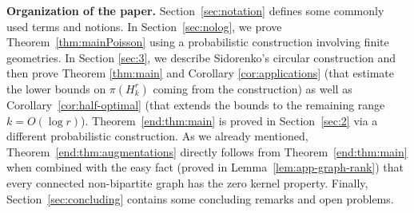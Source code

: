 \documentclass[10pt,a4paper]{article}
\numberwithin{equation}{section}
\theoremstyle{definition}
\theoremstyle{remark}
\newcommand{\hide}[1]{{\color{DarkGreen}#1}}
\renewcommand{\hide}[1]{}
\begin{document}
\medskip\noindent\textbf{Organization of the paper.} Section~\ref{sec:notation} defines some commonly used terms and notions. 
In Section~\ref{sec:nolog},  we prove Theorem~\ref{thm:mainPoisson} using a probabilistic construction involving finite geometries.
In Section \ref{sec:3}, we describe Sidorenko's circular construction and then prove Theorem \ref{thm:main} and Corollary \ref{cor:applications} (that estimate the lower bounds on $\pi(H_k^r)$ coming from the construction) as well as Corollary~\ref{cor:half-optimal} (that extends the bounds to the remaining range $k=O(\log r)$). 
Theorem~\ref{end:thm:main} is proved in Section~\ref{sec:2} via a different probabilistic construction.
As we already mentioned, Theorem~\ref{end:thm:augmentations} directly follows from Theorem~\ref{end:thm:main} when combined with the easy fact (proved in Lemma~\ref{lem:app-graph-rank}) that every connected non-bipartite graph has the zero kernel property. Finally, Section~\ref{sec:concluding} contains some concluding remarks and open problems.



\hide{
In Section \ref{sec:3}, we prove Theorem \ref{thm:main} and Corollary \ref{cor:applications}.  
Sidorenko's circular construction and the R\'enyi exponential representation reduce the required lower bound to estimating the minimum of cyclic sums of independent exponential random variables.  
After centering these variables, we divide the cyclic sums into blocks and apply a maximal inequality for ordinary partial sums.  
This gives a uniform estimate for the minimum when $m\le r/2$.  When $m>r/2$, a complement identity reduces the problem to cyclic sums of length $r-m$.  Combining the resulting lower bound with the known upper bound proves the finite estimate in Theorem \ref{thm:main}. We later use Theorem \ref{thm:main} to prove Corollary \ref{cor:applications}.
}
\end{document}
